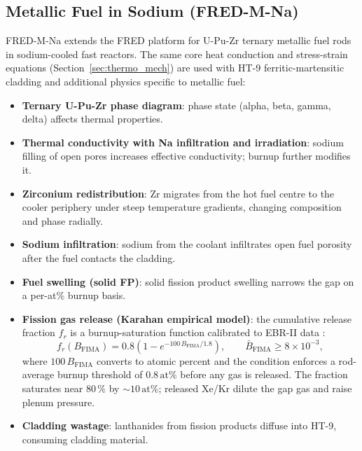 \begin{refsection}

\section{Metallic Fuel in Sodium (FRED-M-Na)}
\label{sec:fred_m_na}

FRED-M-Na extends the FRED platform for U-Pu-Zr ternary metallic fuel rods in sodium-cooled fast reactors.  The same core heat conduction and stress-strain equations (Section~\ref{sec:thermo_mech}) are used with HT-9 ferritic-martensitic cladding and additional physics specific to metallic fuel:

\begin{itemize}
\item \textbf{Ternary U-Pu-Zr phase diagram}: phase state (alpha, beta, gamma, delta) affects thermal properties.
\item \textbf{Thermal conductivity with Na infiltration and irradiation}: sodium filling of open pores increases effective conductivity; burnup further modifies it.
\item \textbf{Zirconium redistribution}: Zr migrates from the hot fuel centre to the cooler periphery under steep temperature gradients, changing composition and phase radially.
\item \textbf{Sodium infiltration}: sodium from the coolant infiltrates open fuel porosity after the fuel contacts the cladding.
\item \textbf{Fuel swelling (solid FP)}: solid fission product swelling narrows the gap on a per-at\% burnup basis.
\item \textbf{Fission gas release (Karahan empirical model)}: the cumulative release fraction $f_r$ is a burnup-saturation function calibrated to EBR-II data \cite{karahan2009}:
\begin{equation*}
  f_r(B_\mathrm{FIMA}) = 0.8\!\left(1 - e^{-100\,B_\mathrm{FIMA}/1.8}\right),
  \qquad \bar{B}_\mathrm{FIMA} \geq 8\times10^{-3},
\end{equation*}
where $100\,B_\mathrm{FIMA}$ converts to atomic percent and the condition enforces a rod-average burnup threshold of $0.8\,\mathrm{at\%}$ before any gas is released.  The fraction saturates near 80\,\% by ${\sim}10\,\mathrm{at\%}$; released Xe/Kr dilute the gap gas and raise plenum pressure.
\item \textbf{Cladding wastage}: lanthanides from fission products diffuse into HT-9, consuming cladding material.
\end{itemize}


\end{refsection}
